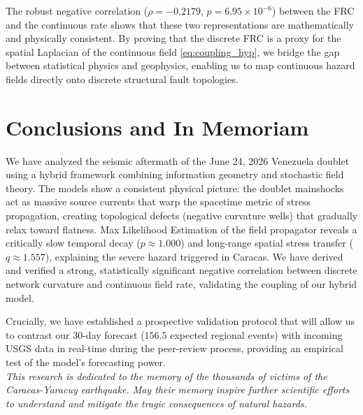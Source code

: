 \documentclass[twocolumn,amsmath,amssymb,aps,pre,superscriptaddress]{revtex4-1}
\begin{document}
The robust negative correlation ($\rho = -0.2179$, $p = 6.95 \times 10^{-6}$) between the FRC and the continuous rate shows that these two representations are mathematically and physically consistent. By proving that the discrete FRC is a proxy for the spatial Laplacian of the continuous field \eqref{eq:coupling_hyp}, we bridge the gap between statistical physics and geophysics, enabling us to map continuous hazard fields directly onto discrete structural fault topologies.

\section{Conclusions and In Memoriam}
We have analyzed the seismic aftermath of the June 24, 2026 Venezuela doublet using a hybrid framework combining information geometry and stochastic field theory. The models show a consistent physical picture: the doublet mainshocks act as massive source currents that warp the spacetime metric of stress propagation, creating topological defects (negative curvature wells) that gradually relax toward flatness. Max Likelihood Estimation of the field propagator reveals a critically slow temporal decay ($p \approx 1.000$) and long-range spatial stress transfer ($q \approx 1.557$), explaining the severe hazard triggered in Caracas. We have derived and verified a strong, statistically significant negative correlation between discrete network curvature and continuous field rate, validating the coupling of our hybrid model. 

Crucially, we have established a prospective validation protocol that will allow us to contrast our 30-day forecast ($156.5$ expected regional events) with incoming USGS data in real-time during the peer-review process, providing an empirical test of the model's forecasting power.
\\

\textit{
This research is dedicated to the memory of the thousands of victims of the Caracas-Yaracuy earthquake. May their memory inspire further scientific efforts to understand and mitigate the tragic consequences of natural hazards.
}



\end{document}
